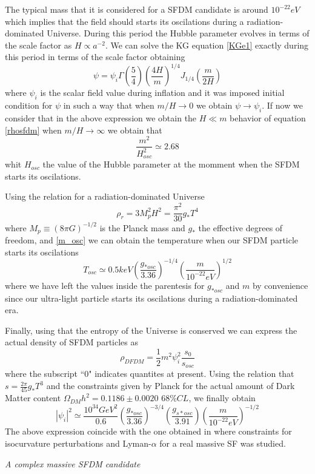 \documentclass[amssymb,twocolumn,prd,nofootinbib,showpacs]{revtex4-1}
\begin{document}
The typical mass that it is considered for a SFDM candidate is around $10^{-22} eV$ which implies that the field should starts its oscilations during a radiation-dominated Universe. During this period the Hubble parameter evolves in terms of the scale factor as $H\propto a^{-2}$. We can solve the KG equation \eqref{KGe1} exactly during this period in terms of the scale factor obtaining
\begin{equation}
\psi = \psi_i\Gamma\left(\frac{5}{4}\right)\left(\frac{4H}{m}\right)^{1/4}J_{1/4}\left(\frac{m}{2H}\right)
\end{equation}
where $\psi_i$ is the scalar field value during inflation and it was imposed initial condition for $\psi$ in such a way that when $m/H\rightarrow 0$ we obtain $\psi\rightarrow\psi_i$. If now we consider that in the above expression we obtain the $H\ll m$ behavior of equation \eqref{rhosfdm} when $m/H\rightarrow \infty$ we obtain that
\begin{equation}\label{m_osc}
\frac{m^2}{H_{osc}^2}\simeq 2.68
\end{equation}
whit $H_{osc}$ the value of the Hubble parameter at the momment when the SFDM starts its oscilations.

Using the relation for a radiation-dominated Universe
\begin{equation}
\rho_r = 3M_p^2H^2=\frac{\pi^2}{30}g_*T^4
\end{equation}
where $M_p\equiv (8\pi G)^{-1/2}$ is the Planck mass and $g_*$ the effective degrees of freedom, and \eqref{m_osc} we can obtain the temperature when our SFDM particle starts its oscilations
\begin{equation}
T_{osc}\simeq 0.5 keV\left(\frac{g_{*osc}}{3.36}\right)^{-1/4}\left(\frac{m}{10^{-22}eV}\right)^{1/2}
\end{equation}
where we have left the values inside the parentesis for $g_{*osc}$ and $m$ by convenience since our ultra-light particle starts its oscilations during a radiation-dominated era. 

Finally, using that the entropy of the Universe is conserved we can express the actual density of SFDM particles as
\begin{equation}
\rho_{DFDM}=\frac{1}{2}m^2\psi_i^2\frac{s_0}{s_{osc}}
\end{equation}
where the subscript ``$0$" indicates quantites at present. Using the relation that $s=\frac{2\pi}{45}g_{*}T^3$ and the constraints given by Planck \cite{Planckcolaboration} for the actual amount of Dark Matter content $\Omega_{DM}h^2=0.1186\pm 0.0020$ $68\% CL$, we finally obtain 
\begin{equation}\label{phi_im2}
|\psi_i|^2\simeq\frac{10^{34}GeV^2}{0.6}\left(\frac{g_{*osc}}{3.36}\right)^{-3/4}\left(\frac{g_{s*osc}}{3.91}\right)\left(\frac{m}{10^{-22}eV}\right)^{-1/2}
\end{equation}
The above expression coincide with the one obtained in \cite{SFrev2} where constraints for isocurvature perturbations and Lyman-$\alpha$ for a real massive SF was studied.
\begin{center}
\textit{A complex massive SFDM candidate}
\end{center}
\end{document}

